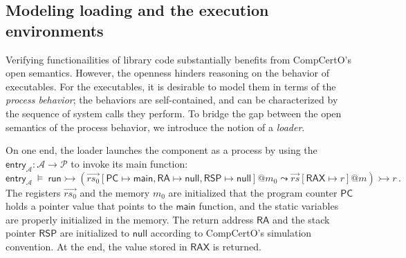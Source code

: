 \documentclass[acmsmall,nonacm]{acmart}
\newcommand{\kw}[1]{\ensuremath{ \mathsf{#1} }}
\begin{document}
\subsection{Modeling loading and the execution environments}
\label{sec:application:loader}  %

Verifying functionailities
of library code substantially benefits from
CompCertO's open semantics.
However,
the openness hinders reasoning
on the behavior of executables.
For the executables,
it is desirable to
model them
in terms of the \textit{process behavior};
the behaviors are self-contained,
and can be characterized
by the sequence of system calls
they perform.
To bridge the gap
between the open semantics of
the process behavior,
we introduce the notion of a \textit{loader}.

On one end,
the loader launches
the component as a process
by using the
$\kw{entry}_\mathcal{A} : \mathcal{A} \rightarrow \mathcal{P}$
to invoke its main function:
\[
  \kw{entry}_\mathcal{A} \:\vDash\:
  \kw{run} \rightarrowtail
  (\vec{rs_0}[\kw{PC}\mapsto \kw{main},
  \kw{RA} \mapsto \kw{null},
  \kw{RSP}\mapsto \kw{null}]@m_0 \leadsto
  \vec{rs}[\kw{RAX} \mapsto r]@m) \rightarrowtail r \,.
\]
The registers $\vec{rs_0}$ and the memory $m_0$ are
initialized that
the program counter $\kw{PC}$ holds a pointer value
that points to
the $\kw{main}$ function,
and the static variables
are properly initialized in the memory.
The return address $\kw{RA}$
and the stack pointer $\kw{RSP}$
are initialized to $\kw{null}$
according to CompCertO's simulation convention.
At the end,
the value stored in $\kw{RAX}$ is returned.
\end{document}
